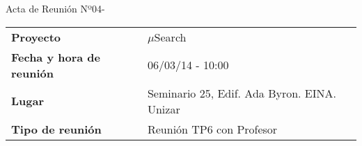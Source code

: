 \begin{center}	
\Large{Acta de Reunión Nº04\hspace{0.25em}-\hspace{0.25em}\tituloReunion}
\end{center}
\vspace{1.5em}

\begin{longtable}{ | L{\tabcolsep} |
				     L{\tabcolsep} | }
\hline %
  \\
\hline %
{\bf Proyecto} & $\mu$Search \\
\hline %
{\bf Fecha y hora de reunión} & 06/03/14 - 10:00 \\
\hline %
{\bf Lugar} & Seminario 25, Edif. Ada Byron. EINA. Unizar \\
\hline %
{\bf Tipo de reunión} & Reunión TP6 con Profesor \\
\hline %
\end{longtable}


